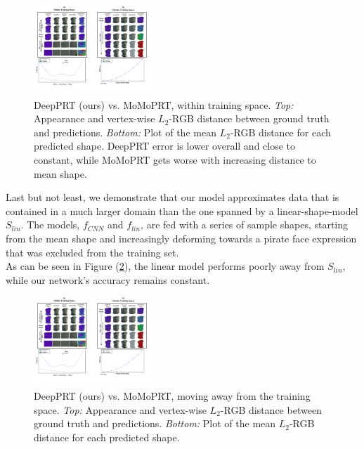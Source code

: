\begin{figure}[h]
  \centering
    \includegraphics[width=0.4\textwidth]{Figures/DPRT_vs_MoMoPRT_a.pdf}
     \caption{DeepPRT (ours) vs. MoMoPRT, within training space.\textit{ Top:} Appearance and vertex-wise $L_2$-RGB distance between ground truth and predictions.\textit{ Bottom:} Plot of the mean $L_2$-RGB distance for each predicted shape. DeepPRT error is lower overall and close to constant, while MoMoPRT gets worse with increasing distance to mean shape.}
     \label{Fig:DPRT vs MoMoPRT A}
\end{figure}
Last but not least, we demonstrate that our model approximates data that is contained in a much larger domain than the one spanned by a linear-shape-model $S_{lin}$. The models, $f_{CNN}$ and $f_{lin}$, are fed with a series of sample shapes, starting from the mean shape and increasingly deforming towards a pirate face expression that was excluded from the training set. \\
As can be seen in Figure (\ref{Fig:DPRT vs MoMoPRT B}), the linear model performs poorly away from $S_{lin}$, while our network's accuracy remains constant.
\begin{figure}[h]
  \centering
    \includegraphics[width=0.4\textwidth]{Figures/DPRT_vs_MoMoPRT_b.pdf}
     \caption{DeepPRT (ours) vs. MoMoPRT, moving away from the training space. \textit{Top:} Appearance and vertex-wise $L_2$-RGB distance between ground truth and predictions.\textit{ Bottom:} Plot of the mean $L_2$-RGB distance for each predicted shape.}
     \label{Fig:DPRT vs MoMoPRT B}
\end{figure}

